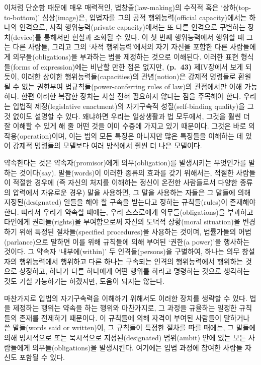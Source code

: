 이처럼 단순함 때문에 매우 매력적인, 법창출(law-making)의 수직적 혹은
‘상하(top-to-bottom)’ 심상(image)은, 입법자를 그의 공적
행위능력(official capacity)에서는 하나의 인격으로, 사적 행위능력(private
capacity)에서는 또 다른 인격으로 구별하는 장치(device)를 통해서만 현실과
조화될 수 있다. 이 첫 번째 행위능력에서 행위할 때 그는 다른 사람들,
그리고 그의 ‘사적 행위능력’에서의 자기 자신을 포함한 다른 사람들에게
의무들(obligations)을 부과하는 법을 제정하는 것으로 이해된다. 이러한
표현 형식들(forms of expression)에는 비난할 만한 점은 없지만,
\textbf{(p.~43)} 제IV장에서 보게 되듯이, 이러한 상이한
행위능력들(capacities)의 관념(notion)은 강제적 명령들로 환원될 수 없는
권한부여 법규칙들(power-conferring rules of law)의 관점에서만 이해
가능하다. 한편 이러한 복잡한 장치는 사실 전혀 필요하지 않다는 점을
주목해야 한다. 우리는 입법적 제정(legislative enactment)의 자기구속적
성질(self-binding quality)을 그것 없이도 설명할 수 있다. 왜냐하면 우리는
일상생활과 법 모두에서, 그것을 훨씬 더 잘 이해할 수 있게 해 줄 어떤 것을
이미 수중에 가지고 있기 때문이다. 그것은 바로 의
작용(operation)이며, 이는 법의 모든 특징은 아니지만 많은 특징들을
이해하는 데 있어 강제적 명령들의 모델보다 여러 방식에서 훨씬 더 나은
모델이다.

약속한다는 것은 약속자(promisor)에게 의무(obligation)를 발생시키는
무엇인가를 말하는 것이다(say). 말들(words)이 이러한 종류의 효과를 갖기
위해서는, 적절한 사람들이 적절한 경우에 (즉 자신의 처지를 이해하는
정신이 온전한 사람들로서 다양한 종류의 압력에서 자유로운 경우) 말을
사용하면, 그 말을 사용하는 자들은 그 말들에 의해 지정된(designated)
일들을 해야 할 구속을 받는다고 정하는 규칙들(rules)이 존재해야 한다.
따라서 우리가 약속할 때에는, 우리 스스로에게 의무들(obligations)을
부과하고 타인에게 권리들(rights)을 부여함으로써 자신의 도덕적 상황(moral
situation)을 변경하기 위해 특정된 절차들(specified procedures)을
사용하는 것이며, 법률가들의 어법(parlance)으로 말하면 이를 위해 규칙들에
의해 부여된 ‘권한(a power)’을 행사하는 것이다. 그 약속자
‘내부에(within)’ 두 인격들(persons)을 구별하여, 하나는 의무 창설자의
행위능력에서 행위하고 다른 하나는 구속되는 인격의 행위능력에서 행위하는
것으로 상정하고, 하나가 다른 하나에게 어떤 행위를 하라고 명령하는 것으로
생각하는 것도 기실 가능하기는 하겠지만, 도움이 되지는 않는다.

마찬가지로 입법의 자기구속력을 이해하기 위해서도 이러한 장치를 생략할 수
있다. 법을 제정하는 행위는 약속을 하는 행위와 마찬가지로, 그 과정을
규율하는 일정한 규칙들의 존재를 전제하기 때문이다. 이 규칙들에 의해
자격이 부여된 사람들이 말하거나 쓴 말들(words said or written)이, 그
규칙들이 특정한 절차를 따를 때에는, 그 말들에 의해 명시적으로 또는
묵시적으로 지정된(designated) 범위(ambit) 안에 있는 모든 사람들에게
의무들(obligations)을 발생시킨다. 여기에는 입법 과정에 참여한 사람들
자신도 포함될 수 있다.

